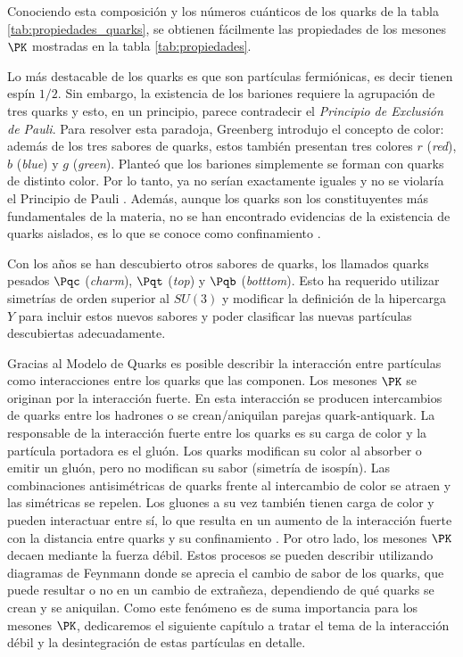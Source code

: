 Conociendo esta composición y los números cuánticos de los quarks de la tabla \ref{tab:propiedades_quarks}, se obtienen fácilmente las propiedades de los mesones $\PK$ mostradas en la tabla \ref{tab:propiedades}.

Lo más destacable de los quarks es que son partículas fermiónicas, es decir tienen espín $1/2$. Sin embargo, la existencia de los bariones requiere la agrupación de tres quarks y esto, en un principio, parece contradecir el \textit{Principio de Exclusión de Pauli}. Para resolver esta paradoja, Greenberg introdujo el concepto de color: además de los tres sabores de quarks, estos también presentan tres colores $r$ (\textit{red}), $b$ (\textit{blue}) y $g$ (\textit{green}). Planteó que los bariones simplemente se forman con quarks de distinto color. Por lo tanto, ya no serían exactamente iguales y no se violaría el Principio de Pauli \cite{Griffiths2008}. Además, aunque los quarks son los constituyentes más fundamentales de la materia, no se han encontrado evidencias de la existencia de quarks aislados, es lo que se conoce como confinamiento \cite{Pais}.

Con los años se han descubierto otros sabores de quarks, los llamados quarks pesados $\Pqc$ (\textit{charm}), $\Pqt$ (\textit{top}) y $\Pqb$ (\textit{botttom}). Esto ha requerido utilizar simetrías de orden superior al $SU(3)$ y modificar la definición de la hipercarga $Y$ para incluir estos nuevos sabores y poder clasificar las nuevas partículas descubiertas adecuadamente.

Gracias al Modelo de Quarks es posible describir la interacción entre partículas como interacciones entre los quarks que las componen. Los mesones $\PK$ se originan por la interacción fuerte. En esta interacción se producen intercambios de quarks entre los hadrones o se crean/aniquilan parejas quark-antiquark. La responsable de la interacción fuerte entre los quarks es su carga de color y la partícula portadora es el gluón.  Los quarks modifican su color al absorber o emitir un gluón, pero no modifican su sabor (simetría de isospín). Las combinaciones antisimétricas de quarks frente al intercambio de color se atraen y las simétricas se repelen. Los gluones a su vez también tienen carga de color y pueden interactuar entre sí, lo que resulta en un aumento de la interacción fuerte con la distancia entre quarks y su confinamiento \cite{notas2020}. Por otro lado, los mesones $\PK$ decaen mediante la fuerza débil. Estos procesos se pueden describir utilizando diagramas de Feynmann donde se aprecia el cambio de sabor de los quarks, que puede resultar o no en un cambio de extrañeza, dependiendo de qué quarks se crean y se aniquilan. Como este fenómeno es de suma importancia para los mesones $\PK$, dedicaremos el siguiente capítulo a tratar el tema de la interacción débil y la desintegración de estas partículas en detalle.\\

